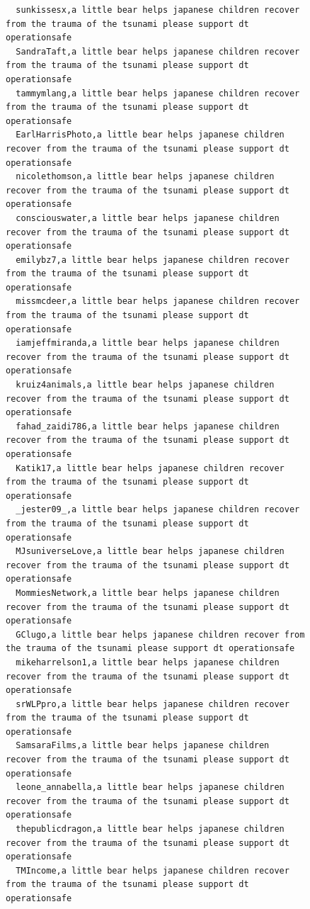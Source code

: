 \begin{figure}[htpb]
\begin{verbatim}
  sunkissesx,a little bear helps japanese children recover from the trauma of the tsunami please support dt operationsafe
  SandraTaft,a little bear helps japanese children recover from the trauma of the tsunami please support dt operationsafe
  tammymlang,a little bear helps japanese children recover from the trauma of the tsunami please support dt operationsafe
  EarlHarrisPhoto,a little bear helps japanese children recover from the trauma of the tsunami please support dt operationsafe
  nicolethomson,a little bear helps japanese children recover from the trauma of the tsunami please support dt operationsafe
  consciouswater,a little bear helps japanese children recover from the trauma of the tsunami please support dt operationsafe
  emilybz7,a little bear helps japanese children recover from the trauma of the tsunami please support dt operationsafe
  missmcdeer,a little bear helps japanese children recover from the trauma of the tsunami please support dt operationsafe
  iamjeffmiranda,a little bear helps japanese children recover from the trauma of the tsunami please support dt operationsafe
  kruiz4animals,a little bear helps japanese children recover from the trauma of the tsunami please support dt operationsafe
  fahad_zaidi786,a little bear helps japanese children recover from the trauma of the tsunami please support dt operationsafe
  Katik17,a little bear helps japanese children recover from the trauma of the tsunami please support dt operationsafe
  _jester09_,a little bear helps japanese children recover from the trauma of the tsunami please support dt operationsafe
  MJsuniverseLove,a little bear helps japanese children recover from the trauma of the tsunami please support dt operationsafe
  MommiesNetwork,a little bear helps japanese children recover from the trauma of the tsunami please support dt operationsafe
  GClugo,a little bear helps japanese children recover from the trauma of the tsunami please support dt operationsafe
  mikeharrelson1,a little bear helps japanese children recover from the trauma of the tsunami please support dt operationsafe
  srWLPpro,a little bear helps japanese children recover from the trauma of the tsunami please support dt operationsafe
  SamsaraFilms,a little bear helps japanese children recover from the trauma of the tsunami please support dt operationsafe
  leone_annabella,a little bear helps japanese children recover from the trauma of the tsunami please support dt operationsafe
  thepublicdragon,a little bear helps japanese children recover from the trauma of the tsunami please support dt operationsafe
  TMIncome,a little bear helps japanese children recover from the trauma of the tsunami please support dt operationsafe

\end{verbatim}
\end{figure}
